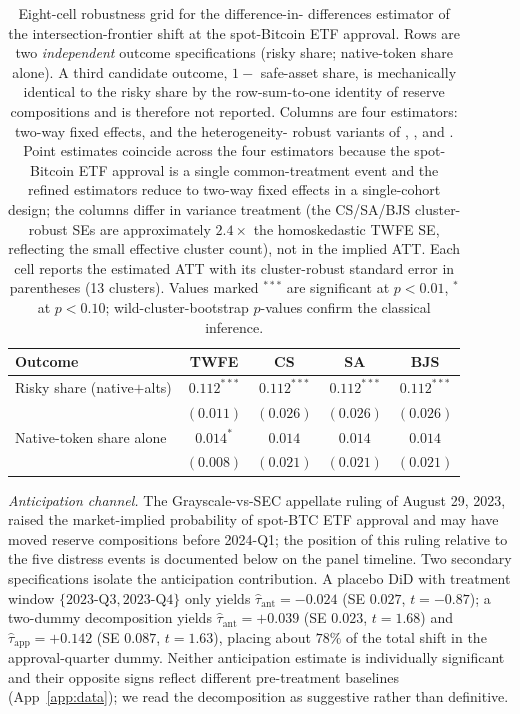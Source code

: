\documentclass[12pt]{article}
\theoremstyle{sampledef}
\theoremstyle{sampleplain}
\theoremstyle{sampleremark}
\newcommand{\1}{\mathbf{1}}
\begin{document}
\begin{table}[H]
\centering
\caption{Eight-cell robustness grid for the difference-in-
differences estimator of the intersection-frontier shift at the
spot-Bitcoin ETF approval. Rows are two \emph{independent} outcome
specifications (risky share; native-token share alone). A third
candidate outcome, $1 - $ safe-asset share, is mechanically
identical to the risky share by the row-sum-to-one identity of
reserve compositions and is therefore not reported. Columns are
four estimators: two-way fixed effects, and the heterogeneity-
robust variants of \citet{Callaway-SantAnna2021},
\citet{Sun-Abraham2021}, and \citet{Borusyak2024}. Point estimates
coincide across the four estimators because the spot-Bitcoin ETF
approval is a single common-treatment event and the refined
estimators reduce to two-way fixed effects in a single-cohort
design; the columns differ in variance treatment (the CS/SA/BJS
cluster-robust SEs are approximately $2.4\times$ the homoskedastic
TWFE SE, reflecting the small effective cluster count), not in the
implied ATT. Each cell reports the estimated ATT with its
cluster-robust standard error in parentheses (13 clusters). Values
marked $^{***}$ are significant at $p < 0.01$, $^{*}$ at
$p < 0.10$; wild-cluster-bootstrap $p$-values confirm the
classical inference.}
\label{tab:robustness-grid}
\small
\begin{tabular}{lcccc}
\toprule
Outcome & TWFE & CS & SA & BJS \\
\midrule
Risky share (native$+$alts) & $0.112^{***}$ & $0.112^{***}$ & $0.112^{***}$ & $0.112^{***}$ \\
                            & $(0.011)$     & $(0.026)$     & $(0.026)$     & $(0.026)$ \\
Native-token share alone    & $0.014^{*}$   & $0.014$       & $0.014$       & $0.014$ \\
                            & $(0.008)$     & $(0.021)$     & $(0.021)$     & $(0.021)$ \\
\bottomrule
\end{tabular}
\end{table}

\emph{Anticipation channel.} The Grayscale-vs-SEC appellate ruling
of August 29, 2023, raised the market-implied probability of
spot-BTC ETF approval and may have moved reserve compositions
before 2024-Q1; the position of this ruling relative to the
five distress events is documented below on the panel
timeline. Two secondary
specifications isolate the anticipation contribution. A placebo
DiD with treatment window $\{\text{2023-Q3}, \text{2023-Q4}\}$
only yields $\hat\tau_{\text{ant}} = -0.024$ (SE $0.027$,
$t = -0.87$); a two-dummy decomposition yields
$\hat\tau_{\text{ant}} = +0.039$ (SE $0.023$, $t = 1.68$) and
$\hat\tau_{\text{app}} = +0.142$ (SE $0.087$, $t = 1.63$), placing
about $78\%$ of the total shift in the approval-quarter dummy.
Neither anticipation estimate is individually significant and
their opposite signs reflect different pre-treatment baselines
(App~\ref{app:data}); we read the decomposition as suggestive
rather than definitive.
\end{document}
